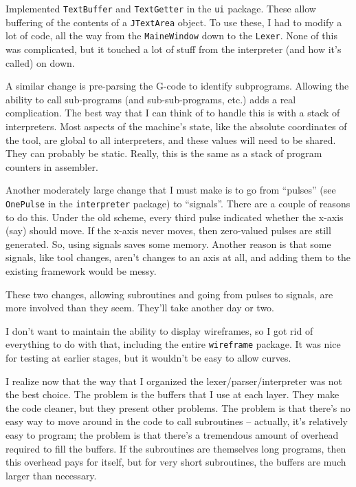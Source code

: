 \documentclass[titlepage,oneside,10pt]{article}
\begin{document}
Implemented {\tt TextBuffer} and {\tt TextGetter} in the {\tt ui}
package. These allow buffering of the contents of a {\tt JTextArea}
object. To use these, I had to modify a lot of code, all the way from
the {\tt MaineWindow} down to the {\tt Lexer}. None of this was
complicated, but it touched a lot of stuff from the interpreter (and
how it's called) on down. 

A similar change is pre-parsing the G-code to identify subprograms.
Allowing the ability to call sub-programs (and sub-sub-programs,
etc.) adds a real complication. The best way that I can think of to
handle this is with a stack of interpreters. Most aspects of the
machine's state, like the absolute coordinates of the tool, are global
to all interpreters, and these values will need to be shared. They can
probably be static. Really, this is the same as a stack of program
counters in assembler.

Another moderately large change that I must make is to go from
``pulses'' (see {\tt OnePulse} in the {\tt interpreter} package) to
``signals''. There are a couple of reasons to do this. Under the old
scheme, every third pulse indicated whether the x-axis (say) should move. If
the x-axis never moves, then zero-valued pulses are still generated. So, using
signals saves some memory. Another reason is that some signals, like
tool changes, aren't changes to an axis at all, and adding them to the
existing framework would be messy.

These two changes, allowing subroutines and going from pulses to
signals, are more involved than they seem. They'll take another day or
two.

I don't want to maintain the ability to display wireframes, so I got
rid of everything to do with that, including the entire 
{\tt wireframe} package. It was nice for testing at earlier stages,
but it wouldn't be easy to allow curves.

I realize now that the way that I organized the
lexer/parser/interpreter was not the best choice. The problem is the
buffers that I use at each layer. They make the code cleaner, but they
present other problems. The problem is that there's no easy way to
move around in the code to call subroutines -- actually, it's
relatively easy to program; the problem is that there's a tremendous
amount of overhead required to fill the buffers. If the subroutines
are themselves long programs, then this overhead pays for itself, but
for very short subroutines, the buffers are much larger than
necessary. 
\end{document}
